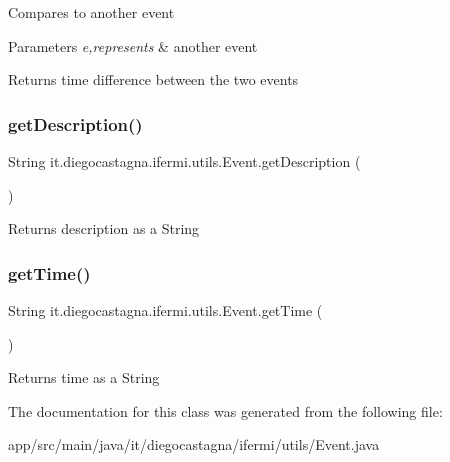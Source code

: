 Compares to another event 
\begin{DoxyParams}{Parameters}
{\em e,represents} & another event \\
\hline
\end{DoxyParams}
\begin{DoxyReturn}{Returns}
time difference between the two events 
\end{DoxyReturn}
\mbox{\label{classit_1_1diegocastagna_1_1ifermi_1_1utils_1_1_event_a232142d3530a740399e99326c133a360}} 
\subsubsection{\texorpdfstring{getDescription()}{getDescription()}}
{\footnotesize\ttfamily String it.\+diegocastagna.\+ifermi.\+utils.\+Event.\+get\+Description (\begin{DoxyParamCaption}{ }\end{DoxyParamCaption})\hspace{0.3cm}{\ttfamily [inline]}}

\begin{DoxyReturn}{Returns}
description as a String 
\end{DoxyReturn}
\mbox{\label{classit_1_1diegocastagna_1_1ifermi_1_1utils_1_1_event_a1683039bf973560726a15eaf5638d0b8}} 
\subsubsection{\texorpdfstring{getTime()}{getTime()}}
{\footnotesize\ttfamily String it.\+diegocastagna.\+ifermi.\+utils.\+Event.\+get\+Time (\begin{DoxyParamCaption}{ }\end{DoxyParamCaption})\hspace{0.3cm}{\ttfamily [inline]}}

\begin{DoxyReturn}{Returns}
time as a String 
\end{DoxyReturn}


The documentation for this class was generated from the following file\+:\begin{DoxyCompactItemize}
\item 
app/src/main/java/it/diegocastagna/ifermi/utils/Event.\+java\end{DoxyCompactItemize}
